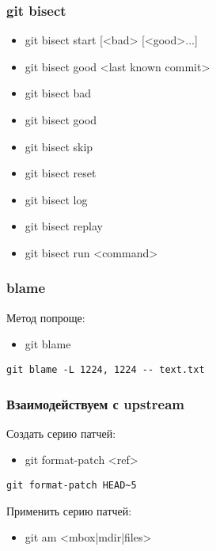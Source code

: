 \begin{frame}
	\frametitle{git bisect}

	\begin{itemize}
		\item git bisect start [<bad> [<good>...]
		\item git bisect good <last known commit>
		\item git bisect bad
		\item git bisect good
		\item git bisect skip
		\item git bisect reset
		\item git bisect log
		\item git bisect replay
			\pause
		\item git bisect run <command>
	\end{itemize}
\end{frame}

\begin{frame}[fragile]
	\frametitle{blame}

	Метод попроще:

	\begin{itemize}
		\item git blame 
	\end{itemize}

	\begin{verbatim}
git blame -L 1224, 1224 -- text.txt
	\end{verbatim}
	
\end{frame}

\begin{frame}[fragile]
	\frametitle{Взаимодействуем с upstream}

	Создать серию патчей:
	\begin{itemize}
		\item git format-patch <ref>
	\end{itemize}

	\begin{verbatim}
git format-patch HEAD~5
	\end{verbatim}

	Применить серию патчей:
	\begin{itemize}
		\item git am <mbox|mdir|files>
	\end{itemize}
\end{frame}

